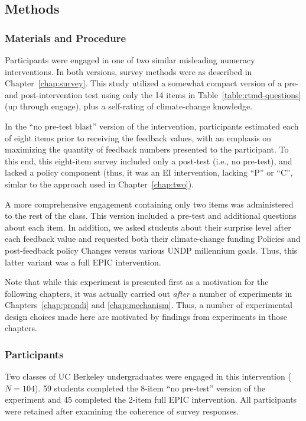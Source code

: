 \subsection{Methods} 
\label{sec:evilndi-methods}

\subsubsection{Materials and Procedure}

Participants were engaged in one of two similar misleading numeracy
interventions. In both versions, survey methods were as described in
Chapter~\ref{chap:survey}. This study utilized a somewhat compact version of a
pre- and post-intervention test using only the 14 items in
Table~\ref{table:rtmd-questions} (up through \textsf{engage}), plus a
self-rating of climate-change knowledge.  

In the “no pre-test blast” version of the intervention, participants estimated
each of eight items prior to receiving the feedback values, with an emphasis on
maximizing the quantity of feedback numbers presented to the participant. To
this end, this eight-item survey included only a post-test (i.e., no pre-test),
and lacked a policy component (thus, it was an EI intervention, lacking ``P'' or
``C'', simlar to the approach used in Chapter~\ref{chap:two}). 

A more comprehensive engagement containing only two items was administered to
the rest of the class. This version included a pre-test and additional questions
about each item. In addition, we asked students about their surprise level after
each feedback value and requested both their climate-change funding Policies and
post-feedback policy Changes versus various UNDP millennium goals.  Thus, this
latter variant was a full EPIC intervention.

Note that while this experiment is presented first as a motivation for the
following chapters, it was actually carried out \emph{after} a number of
experiments in Chapters~\ref{chap:prondi} and \ref{chap:mechanism}. Thus, a
number of experimental design choices made here are motivated by findings from
experiments in those chapters.

\subsubsection{Participants}

Two classes of UC Berkeley undergraduates were engaged in this intervention
($N=104$). 59 students completed the 8-item “no pre-test” version of the
experiment and 45 completed the 2-item full EPIC intervention. All participants
were retained after examining the coherence of survey responses.


